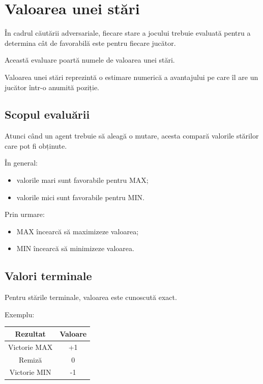 \documentclass[12pt,a4paper]{article}
\begin{document}
\section{Valoarea unei stări}

În cadrul căutării adversariale, fiecare stare a jocului trebuie evaluată pentru a determina cât de favorabilă este pentru fiecare jucător.

Această evaluare poartă numele de valoarea unei stări.

Valoarea unei stări reprezintă o estimare numerică a avantajului pe care îl are un jucător într-o anumită poziție.

\subsection{Scopul evaluării}

Atunci când un agent trebuie să aleagă o mutare, acesta compară valorile stărilor care pot fi obținute.

În general:

\begin{itemize}
\item valorile mari sunt favorabile pentru MAX;
\item valorile mici sunt favorabile pentru MIN.
\end{itemize}

Prin urmare:

\begin{itemize}
\item MAX încearcă să maximizeze valoarea;
\item MIN încearcă să minimizeze valoarea.
\end{itemize}

\subsection{Valori terminale}

Pentru stările terminale, valoarea este cunoscută exact.

Exemplu:

\begin{center}
\begin{tabular}{|c|c|}
\hline
Rezultat & Valoare \\
\hline
Victorie MAX & +1 \\
\hline
Remiză & 0 \\
\hline
Victorie MIN & -1 \\
\hline
\end{tabular}
\end{center}
\end{document}
